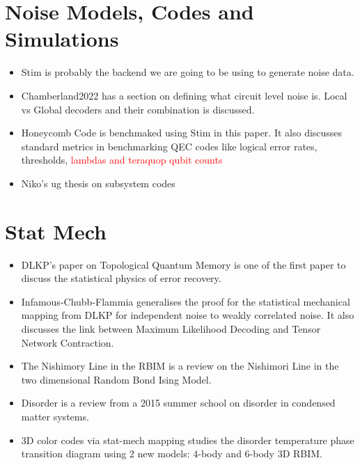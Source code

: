 \section{Noise Models, Codes and Simulations}\label{sec: noise-models-lit-rev}
\begin{itemize}
    \item Stim\cite{Gidney2021-am} is probably the backend we are going to be using to generate noise data.
    \item Chamberland2022\cite{Chamberland2022-ei} has a section on defining what circuit level noise is. Local vs Global decoders and their combination is discussed.
    \item Honeycomb Code\cite{Gidney2022-si} is benchmaked using Stim in this paper. It also discusses standard metrics in benchmarking QEC codes like logical error rates, thresholds, \textcolor{red}{lambdas and teraquop qubit counts}
    \item Niko's ug thesis on subsystem codes\cite{Breuckmann2011-br}
\end{itemize}

\section{Stat Mech}\label{sec: stat-mech-lit-rev}
\begin{itemize}
    \item DLKP's\cite{Dennis2002-wo} paper on Topological Quantum Memory is one of the first paper to discuss the statistical physics of error recovery.
    \item Infamous-Chubb-Flammia\cite{Chubb2018-gh} generalises the proof for the statistical mechanical mapping from DLKP\cite{Dennis2002-wo} for independent noise to weakly correlated noise. It also discusses the link between Maximum Likelihood Decoding and Tensor Network Contraction.
    \item The Nishimory Line in the RBIM\cite{Lu2017-oc} is a review on the Nishimori Line in the two dimensional Random Bond Ising Model.
    \item Disorder\cite{Radzihovsky2015-mo} is a review from a 2015 summer school on disorder in condensed matter systems.
    \item 3D color codes via stat-mech mapping\cite{Kubica2018-ts} studies the disorder temperature phase transition diagram using 2 new models: 4-body and 6-body 3D RBIM.
\end{itemize}

